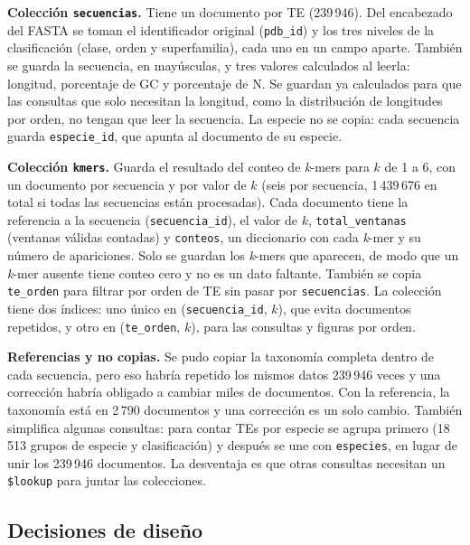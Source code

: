 \medskip\noindent\textbf{Colección \texttt{secuencias}.} Tiene un
documento por TE (239\,946). Del encabezado del FASTA se toman el
identificador original (\texttt{pdb\_id}) y los tres niveles de la
clasificación (clase, orden y superfamilia), cada uno en un campo
aparte. También se guarda la secuencia, en mayúsculas, y tres valores
calculados al leerla: longitud, porcentaje de GC y porcentaje de N. Se
guardan ya calculados para que las consultas que solo necesitan la
longitud, como la distribución de longitudes por orden, no tengan que
leer la secuencia. La especie no se copia: cada secuencia guarda
\texttt{especie\_id}, que apunta al documento de su especie.

\medskip\noindent\textbf{Colección \texttt{kmers}.} Guarda el resultado
del conteo de \textit{k}-mers para $k$ de 1 a 6, con un documento por
secuencia y por valor de $k$ (seis por secuencia, 1\,439\,676 en total
si todas las secuencias están procesadas). Cada documento tiene la
referencia a la secuencia (\texttt{secuencia\_id}), el valor de $k$,
\texttt{total\_ventanas} (ventanas válidas contadas) y
\texttt{conteos}, un diccionario con cada \textit{k}-mer y su número de
apariciones. Solo se guardan los \textit{k}-mers que aparecen, de modo
que un \textit{k}-mer ausente tiene conteo cero y no es un dato
faltante. También se copia \texttt{te\_orden} para filtrar por orden de
TE sin pasar por \texttt{secuencias}. La colección tiene dos índices:
uno único en (\texttt{secuencia\_id}, $k$), que evita documentos
repetidos, y otro en (\texttt{te\_orden}, $k$), para las consultas y
figuras por orden.

\medskip\noindent\textbf{Referencias y no copias.} Se pudo copiar la
taxonomía completa dentro de cada secuencia, pero eso habría repetido
los mismos datos 239\,946 veces y una corrección habría obligado a
cambiar miles de documentos. Con la referencia, la taxonomía está en
2\,790 documentos y una corrección es un solo cambio. También simplifica
algunas consultas: para contar TEs por especie se agrupa primero
(18\,513 grupos de especie y clasificación) y después se une con
\texttt{especies}, en lugar de unir los 239\,946 documentos. La
desventaja es que otras consultas necesitan un \texttt{\$lookup} para
juntar las colecciones.

\subsection*{Decisiones de diseño}

